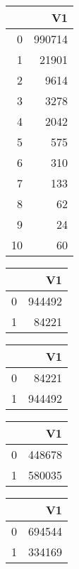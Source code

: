 \bigskip\bigskip
\centering
\begin{tabular}{rr}
  \hline
 & V1 \\ 
  \hline
0 & 990714 \\ 
  1 & 21901 \\ 
  2 & 9614 \\ 
  3 & 3278 \\ 
  4 & 2042 \\ 
  5 & 575 \\ 
  6 & 310 \\ 
  7 & 133 \\ 
  8 &  62 \\ 
  9 &  24 \\ 
  10 &  60 \\ 
   \hline
\end{tabular}

\bigskip\bigskip
\centering
\begin{tabular}{rr}
  \hline
 & V1 \\ 
  \hline
0 & 944492 \\ 
  1 & 84221 \\ 
   \hline
\end{tabular}

\bigskip\bigskip
\centering
\begin{tabular}{rr}
  \hline
 & V1 \\ 
  \hline
0 & 84221 \\ 
  1 & 944492 \\ 
   \hline
\end{tabular}

\bigskip\bigskip
\centering
\begin{tabular}{rr}
  \hline
 & V1 \\ 
  \hline
0 & 448678 \\ 
  1 & 580035 \\ 
   \hline
\end{tabular}

\bigskip\bigskip
\centering
\begin{tabular}{rr}
  \hline
 & V1 \\ 
  \hline
0 & 694544 \\ 
  1 & 334169 \\ 
   \hline
\end{tabular}

